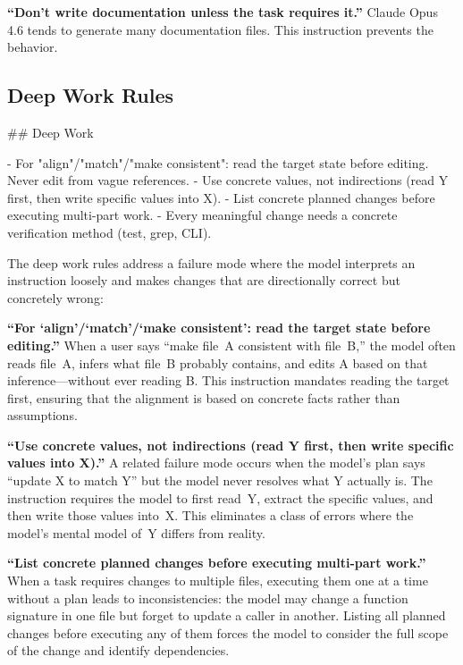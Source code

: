 \documentclass{article}
\begin{document}
\textbf{``Don't write documentation unless the task requires it.''}  Claude Opus 4.6 tends to generate many documentation files.  This instruction prevents the behavior.

\subsection{Deep Work Rules}

\begin{prompt}
## Deep Work

- For "align"/"match"/"make consistent": read the target state before editing. Never edit from vague references.
- Use concrete values, not indirections (read Y first, then write specific values into X).
- List concrete planned changes before executing multi-part work.
- Every meaningful change needs a concrete verification method (test, grep, CLI).
\end{prompt}

\noindent The deep work rules address a failure mode where the model interprets an instruction loosely and makes changes that are directionally correct but concretely wrong:

\textbf{``For `align'/`match'/`make consistent': read the target state before editing.''}  When a user says ``make file~A consistent with file~B,'' the model often reads file~A, infers what file~B probably contains, and edits A based on that inference---without ever reading B.  This instruction mandates reading the target first, ensuring that the alignment is based on concrete facts rather than assumptions.

\textbf{``Use concrete values, not indirections (read Y first, then write specific values into X).''}  A related failure mode occurs when the model's plan says ``update X to match Y'' but the model never resolves what Y actually is.  The instruction requires the model to first read~Y, extract the specific values, and then write those values into~X.  This eliminates a class of errors where the model's mental model of~Y differs from reality.

\textbf{``List concrete planned changes before executing multi-part work.''}  When a task requires changes to multiple files, executing them one at a time without a plan leads to inconsistencies: the model may change a function signature in one file but forget to update a caller in another.  Listing all planned changes before executing any of them forces the model to consider the full scope of the change and identify dependencies.
\end{document}

